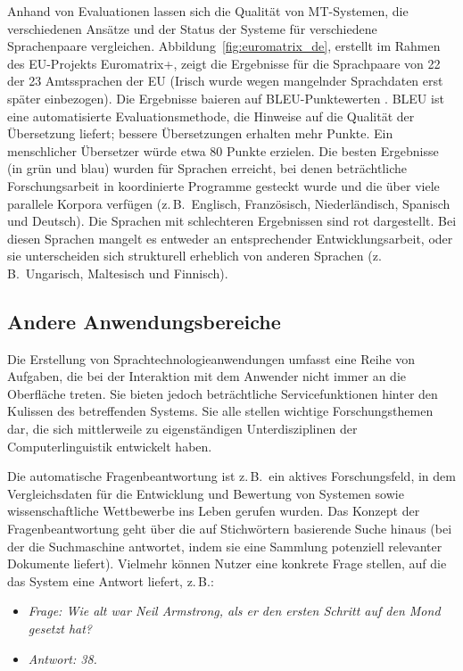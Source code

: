 \begin{multicols}{2}
Anhand von Evaluationen lassen sich die Qualität von MT-Systemen, die verschiedenen Ansätze und der Status der Systeme für verschiedene Sprachenpaare vergleichen. Abbildung~\ref{fig:euromatrix_de}, erstellt im Rahmen des EU-Projekts Euromatrix+, zeigt die Ergebnisse für die Sprachpaare von 22 der 23 Amtssprachen der EU (Irisch wurde wegen mangelnder Sprachdaten erst später einbezogen). Die Ergebnisse baieren auf BLEU-Punktewerten \cite{bleu1}. BLEU ist eine automatisierte Evaluationsmethode, die Hinweise auf die Qualität der Übersetzung liefert; bessere Übersetzungen erhalten mehr Punkte. Ein menschlicher Übersetzer würde etwa 80 Punkte erzielen.
Die besten Ergebnisse (in grün und blau) wurden für Sprachen erreicht, bei denen beträchtliche Forschungsarbeit in koordinierte Programme gesteckt wurde und die über viele parallele Korpora verfügen (z.\,B.~Englisch, Französisch, Niederländisch, Spanisch und Deutsch). Die Sprachen mit schlechteren Ergebnissen sind rot dargestellt. Bei diesen Sprachen mangelt es entweder an entsprechender Entwicklungsarbeit, oder sie unterscheiden sich strukturell erheblich von anderen Sprachen (z.\,B.~Ungarisch, Maltesisch und Finnisch).

\subsection{Andere Anwendungsbereiche}

Die Erstellung von Sprachtechnologieanwendungen umfasst eine Reihe von Aufgaben, die bei der Interaktion mit dem Anwender nicht immer an die Oberfläche treten. Sie bieten jedoch beträchtliche Servicefunktionen hinter den Kulissen des betreffenden Systems. Sie alle stellen wichtige Forschungsthemen dar, die sich mittlerweile zu eigenständigen Unterdisziplinen der Computerlinguistik entwickelt haben. 

Die automatische Fragenbeantwortung ist z.\,B.~ein aktives Forschungsfeld,
in dem Vergleichsdaten für die Entwicklung und Bewertung von Systemen sowie wissenschaftliche 
Wettbewerbe ins Leben gerufen wurden. Das Konzept der Fragenbeantwortung geht über die auf Stichwörtern basierende Suche hinaus (bei der die Suchmaschine antwortet, indem sie eine Sammlung potenziell relevanter Dokumente liefert). Vielmehr können Nutzer eine konkrete Frage stellen, auf die das System eine Antwort liefert, z.\,B.:

\begin{itemize}
\item[] \textit{Frage: Wie alt war Neil Armstrong, als er den ersten Schritt auf den Mond gesetzt hat?}
\item[] \textit{Antwort: 38.}
\end{itemize}


\end{multicols}
